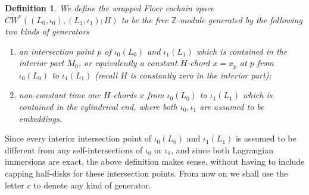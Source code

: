 \documentclass{amsart}
\newtheorem{definition}[theorem]{Definition}
\numberwithin{equation}{section}
\numberwithin{figure}{section}
\begin{document}
\begin{definition}\label{definition of wrapped Floer cochain space for a pair}
	We define the wrapped Floer cochain space $CW^{*}((L_{0}, \iota_{0}), (L_{1}, \iota_{1}); H)$ to be the free $\mathbb{Z}$-module generated by the following two kinds of generators
\begin{enumerate}[label=(\roman*)]

\item an intersection point $p$ of $\iota_{0}(L_{0})$ and $\iota_{1}(L_{1})$ which is contained in the interior part $M_{0}$, or equivalently a constant $H$-chord $x = x_{p}$ at $p$ from $\iota_{0}(L_{0})$ to $\iota_{1}(L_{1})$ (recall $H$ is constantly zero in the interior part);

\item non-constant time one $H$-chords $x$ from $\iota_{0}(L_{0})$ to $\iota_{1}(L_{1})$ which is contained in the cylindrical end, where both $\iota_{0}, \iota_{1}$ are assumed to be embeddings.

\end{enumerate}

\end{definition}

	Since every interior intersection point of $\iota_{0}(L_{0})$ and $\iota_{1}(L_{1})$ is assumed to be different from any self-intersections of $\iota_{0}$ or $\iota_{1}$, and since both Lagrangian immersions are exact, the above definition makes sense, without having to include capping half-disks for these intersection points. From now on we shall use the letter $c$ to denote any kind of generator. \par

\end{document}
